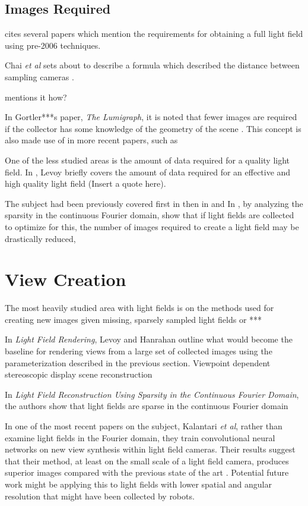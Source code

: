 \documentclass[12pt]{report}
\begin{document}
\subsection{Images Required}

\cite{Levoy06a} cites several papers which mention the requirements for obtaining a full light field using pre-2006 techniques. 

Chai \emph{et al} sets about to describe a formula which described the distance between sampling cameras \cite{Chai00}.

\cite{Isaksen01} mentions it how?

In Gortler***s paper, \emph{The Lumigraph}, it is noted that fewer images are required if the collector has some knowledge of the geometry of the scene \cite{Gortler96}. This concept is also made use of in more recent papers, such as \cite{Kim13}

One of the less studied areas is the amount of data required for a quality light field.
In \cite{Levoy06a}, Levoy briefly covers the amount of data required for an effective and high quality light field (Insert a quote here).

The subject had been previously covered first in \cite{Gortler96} then in \cite{Isaksen01} and \cite{Chai00}
In \cite{Shi14}, by analyzing the sparsity in the continuous Fourier domain, show that if light fields are collected to optimize for this, the number of images required to create a light field may be drastically reduced, 
\section{View Creation}
The most heavily studied area with light fields is on the methods used for creating new images given missing, sparsely sampled light fields or ***

In \emph{Light Field Rendering}, Levoy and Hanrahan outline what would become the baseline for rendering views from a large set of collected images using the parameterization described in the previous section. 
\cite{Katayama95} Viewpoint dependent stereoscopic display
\cite{Kim13} scene reconstruction

In \emph{Light Field Reconstruction Using Sparsity in the Continuous Fourier Domain}, the authors show that light fields are sparse in the continuous Fourier domain \cite{Shi14} 

In one of the most recent papers on the subject, Kalantari \emph{et al}, rather than examine light fields in the Fourier domain, they train convolutional neural networks on new view synthesis within light field cameras. Their results suggest that their method, at least on the small scale of a light field camera, produces superior images compared with the previous state of the art \cite{Kalantari16}. Potential future work might be applying this to light fields with lower spatial and angular resolution that might have been collected by robots.
\end{document}
